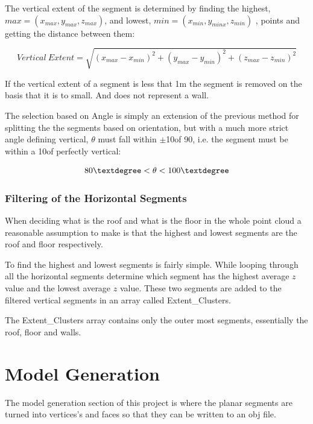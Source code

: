 			The vertical extent of the segment is determined by finding the highest, $max = (x_{max},y_{max},z_{max})$, and lowest, $min = (x_{min},y_{minx},z_{min})$ , points and getting the distance between them:
			
			\begin{equation}
			Vertical \: Extent = \sqrt{(x_{max} - x_{min})^2+(y_{max} - y_{min})^2+(z_{max} - z_{min})^2}
			\end{equation}
			
			If the vertical extent of a segment is less that 1m the segment is removed on the basis that it is to small. And does not represent a wall.
			
			The selection based on Angle is simply an extension of the previous method for splitting the the segments based on orientation, but with a much more strict angle defining vertical, $\theta$ must fall within $\pm$10\textdegree of 90\textdegree, i.e. the segment must be within a 10\textdegree of perfectly vertical:
			
			\begin{equation}
			80\textdegree < \theta < 100\textdegree
			\end{equation}
			


			
			\subsubsection{Filtering of the Horizontal Segments}
			
			When deciding what is the roof and what is the floor in the whole point cloud a reasonable assumption to make is that the highest and lowest segments are the roof and floor respectively.
			
			To find the highest and lowest segments is fairly simple. While looping through all the horizontal segments determine which segment has the highest average $z$ value and the lowest average $z$ value. These two segments are added to the filtered vertical segments in an array called Extent\_Clusters.
			
			The Extent\_Clusters array contains only the outer most segments, essentially the roof, floor and walls.
			
			

			
	\section{Model Generation}
		The model generation section of this project is where the planar segments are turned into vertices's and faces so that they can be written to an obj file.
		
